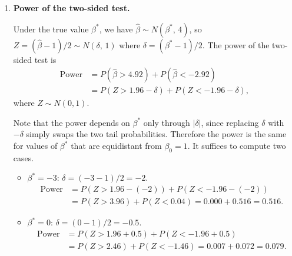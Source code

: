 \documentclass[12pt]{article}
\begin{document}
\begin{enumerate}
\begin{enumerate}
\textbf{Two-sided test} ($H_1\colon \beta \ne 1$): Reject $H_0$ if $|Z| > z_{0.025} = 1.96$. In terms of $\hat{\beta}$:
\begin{align*}
\left|\frac{\hat{\beta} - 1}{2}\right| > 1.96
\quad&\Longleftrightarrow\quad
|\hat{\beta} - 1| > 3.92 \\
&\Longleftrightarrow\quad
\hat{\beta} > 4.92 \;\text{ or }\; \hat{\beta} < -2.92.
\end{align*}

\textbf{One-sided test} ($H_1\colon \beta > 1$): Reject $H_0$ if $Z > z_{0.05} = 1.645$. In terms of $\hat{\beta}$:
$$
\frac{\hat{\beta} - 1}{2} > 1.645
\quad\Longleftrightarrow\quad
\hat{\beta} > 1 + 2 \times 1.645 = 4.29.
$$

\bigskip

\item \textbf{Power of the two-sided test.}

Under the true value $\beta^*$, we have $\hat{\beta} \sim N(\beta^*,\, 4)$, so $Z = (\hat{\beta} - 1)/2 \sim N(\delta,\, 1)$ where $\delta = (\beta^* - 1)/2$. The power of the two-sided test is
\begin{align*}
\text{Power} &= P(\hat{\beta} > 4.92) + P(\hat{\beta} < -2.92) \\
&= P\!\left(Z > 1.96 - \delta\right) + P\!\left(Z < -1.96 - \delta\right),
\end{align*}
where $Z \sim N(0, 1)$.

Note that the power depends on $\beta^*$ only through $|\delta|$, since replacing $\delta$ with $-\delta$ simply swaps the two tail probabilities. Therefore the power is the same for values of $\beta^*$ that are equidistant from $\beta_0 = 1$. It suffices to compute two cases.

\begin{itemize}
\item $\beta^* = -3$: $\delta = (-3 - 1)/2 = -2$.
\begin{align*}
\text{Power} &= P(Z > 1.96 - (-2)) + P(Z < -1.96 - (-2)) \\
&= P(Z > 3.96) + P(Z < 0.04) = 0.000 + 0.516 = 0.516.
\end{align*}

\item $\beta^* = 0$: $\delta = (0 - 1)/2 = -0.5$.
\begin{align*}
\text{Power} &= P(Z > 1.96 + 0.5) + P(Z < -1.96 + 0.5) \\
&= P(Z > 2.46) + P(Z < -1.46) = 0.007 + 0.072 = 0.079.
\end{align*}


\end{itemize}
\end{enumerate}
\end{enumerate}
\end{document}
